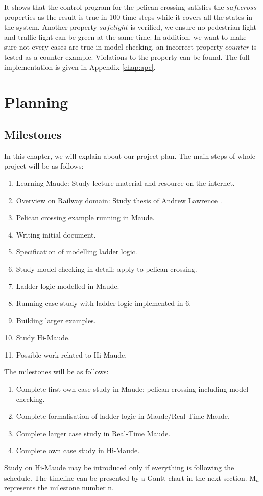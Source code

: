 \documentclass[a4paper,11pt]{report}
\begin{document}
\vspace{0.2cm}
It shows that the control program for the pelican crossing satisfies the $safecross$ properties as the result is true in 100 time steps while it covers all the states in the system. Another property $safelight$ is verified, we ensure no pedestrian light and traffic light can be green at the same time. In addition, we want to make sure not every cases are true in model checking, an incorrect property $counter$ is tested as a counter example. Violations to the property can be found.
The full implementation is given in Appendix \ref{chap:apc}.

\newpage
\chapter{Planning}
\label{plan}
\section{Milestones}
In this chapter, we will explain about our project plan. The main steps of whole project will be as follows:
\begin{enumerate}
  \item Learning Maude: Study lecture material \cite{ss} and resource on the internet.
  \item Overview on Railway domain: Study thesis of Andrew Lawrence \cite{mres}. 
  \item Pelican crossing example running in Maude.
	\item Writing initial document.
	\item Specification of modelling ladder logic.
	\item Study model checking in detail: apply to pelican crossing.
	\item Ladder logic modelled in Maude.
	\item Running case study with ladder logic implemented in $6$.
	\item Building larger examples.
	\item Study Hi-Maude.
	\item Possible work related to Hi-Maude.
\end{enumerate}
The milestones will be as follows:
\begin{enumerate}
	\item Complete first own case study in Maude: pelican crossing including model checking.
	\item Complete formalisation of ladder logic in Maude/Real-Time Maude.
	\item Complete larger case study in Real-Time Maude.
	\item Complete own case study in Hi-Maude.
\end{enumerate}
Study on Hi-Maude may be introduced only if everything is following the schedule. The timeline can be presented by a Gantt chart in the next section. M$_{n}$ represents the milestone number n.
\end{document}
